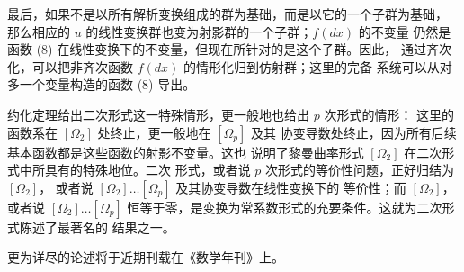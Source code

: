 \documentclass[11pt]{article}
\begin{document}
最后，如果不是以所有解析变换组成的群为基础，而是以它的一个子群为基础，
那么相应的 \(u\) 的线性变换群也变为射影群的一个子群；\(f(dx)\) 的不变量
仍然是函数 (8) 在线性变换下的不变量，但现在所针对的是这个子群。因此，
通过齐次化，可以把非齐次函数 \(f(dx)\) 的情形化归到仿射群；这里的完备
系统可以从对多一个变量构造的函数 (8) 导出。

约化定理给出二次形式这一特殊情形，更一般地也给出 \(p\) 次形式的情形：
这里的函数系在 \([\Omega_2]\) 处终止，更一般地在 \([\Omega_p]\) 及其
协变导数处终止，因为所有后续基本函数都是这些函数的射影不变量。这也
说明了黎曼曲率形式 \([\Omega_2]\) 在二次形式中所具有的特殊地位。二次
形式，或者说 \(p\) 次形式的等价性问题，正好归结为 \([\Omega_2]\)，
或者说 \([\Omega_2]\ldots[\Omega_p]\) 及其协变导数在线性变换下的
等价性；而 \([\Omega_2]\)，或者说 \([\Omega_2]\ldots[\Omega_p]\)
恒等于零，是变换为常系数形式的充要条件。这就为二次形式陈述了最著名的
结果之一。

更为详尽的论述将于近期刊载在《数学年刊》上。

\clearpage
\setcounter{footnote}{0}
\end{document}
